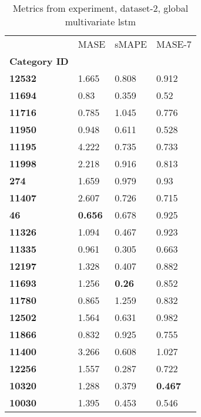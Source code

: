 \begin{table}[H]
\centering
\caption{Metrics from experiment, dataset-2, global multivariate lstm}
\label{table:global-multivariate-lstm-dataset-2}
\begin{tabular}{llll}
\toprule
{} &            MASE &          sMAPE &          MASE-7 \\
\textbf{Category ID} &                 &                &                 \\
\midrule
\textbf{12532      } &           1.665 &          0.808 &           0.912 \\
\textbf{11694      } &            0.83 &          0.359 &            0.52 \\
\textbf{11716      } &           0.785 &          1.045 &           0.776 \\
\textbf{11950      } &           0.948 &          0.611 &           0.528 \\
\textbf{11195      } &           4.222 &          0.735 &           0.733 \\
\textbf{11998      } &           2.218 &          0.916 &           0.813 \\
\textbf{274        } &           1.659 &          0.979 &            0.93 \\
\textbf{11407      } &           2.607 &          0.726 &           0.715 \\
\textbf{46         } &  \textbf{0.656} &          0.678 &           0.925 \\
\textbf{11326      } &           1.094 &          0.467 &           0.923 \\
\textbf{11335      } &           0.961 &          0.305 &           0.663 \\
\textbf{12197      } &           1.328 &          0.407 &           0.882 \\
\textbf{11693      } &           1.256 &  \textbf{0.26} &           0.852 \\
\textbf{11780      } &           0.865 &          1.259 &           0.832 \\
\textbf{12502      } &           1.564 &          0.631 &           0.982 \\
\textbf{11866      } &           0.832 &          0.925 &           0.755 \\
\textbf{11400      } &           3.266 &          0.608 &           1.027 \\
\textbf{12256      } &           1.557 &          0.287 &           0.722 \\
\textbf{10320      } &           1.288 &          0.379 &  \textbf{0.467} \\
\textbf{10030      } &           1.395 &          0.453 &           0.546 \\
\bottomrule
\end{tabular}
\end{table}

